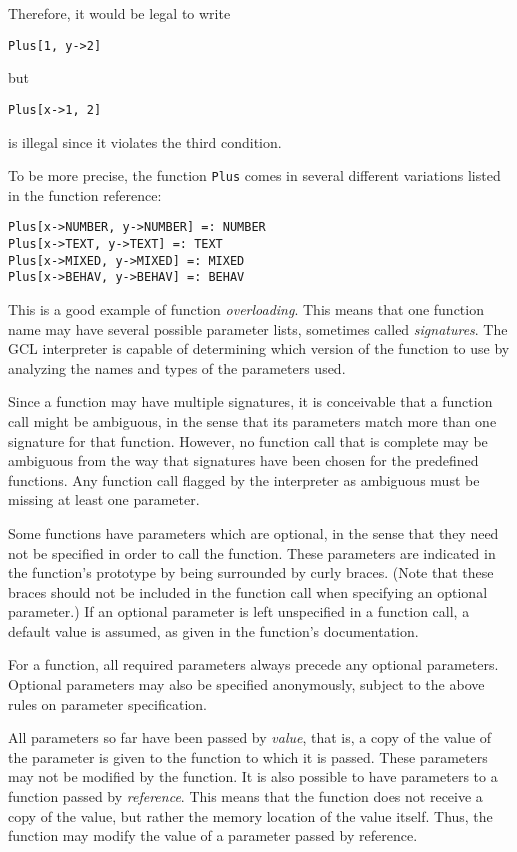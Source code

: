 \noindent Therefore, it would be legal to write

\begin{verbatim}
Plus[1, y->2]
\end{verbatim}

\noindent but

\begin{verbatim}
Plus[x->1, 2]
\end{verbatim}

\noindent is illegal since it violates the third condition.

To be more precise, the function {\tt Plus} comes in several different
variations listed in the function reference:

\begin{verbatim}
Plus[x->NUMBER, y->NUMBER] =: NUMBER
Plus[x->TEXT, y->TEXT] =: TEXT
Plus[x->MIXED, y->MIXED] =: MIXED
Plus[x->BEHAV, y->BEHAV] =: BEHAV 
\end{verbatim}

\noindent This is a good example of function {\it overloading}.  This
means that one function name may have several possible parameter
lists, sometimes called {\it signatures}.  The GCL interpreter is
capable of determining which version of the function to use by
analyzing the names and types of the parameters used.

Since a function may have multiple signatures, it is conceivable that
a function call might be ambiguous, in the sense that its parameters
match more than one signature for that function.  However, no function
call that is complete may be ambiguous from the way that signatures
have been chosen for the predefined functions.  Any function call
flagged by the interpreter as ambiguous must be missing at least one
parameter.

Some functions have parameters which are optional, in the sense that
they need not be specified in order to call the function.  These
parameters are indicated in the function's prototype by being
surrounded by curly braces.  (Note that these braces should not be
included in the function call when specifying an optional parameter.)
If an optional parameter is left unspecified in a function call, a
default value is assumed, as given in the function's documentation.

For a function, all required parameters always precede any optional
parameters.  Optional parameters may also be specified anonymously,
subject to the above rules on parameter specification.

All parameters so far have been passed by {\it value}, that is, a copy
of the value of the parameter is given to the function to which it is
passed.  These parameters may not be modified by the function.  It is
also possible to have parameters to a function passed by {\it
reference}.  This means that the function does not receive a copy of
the value, but rather the memory location of the value itself.  Thus,
the function may modify the value of a parameter passed by reference.

